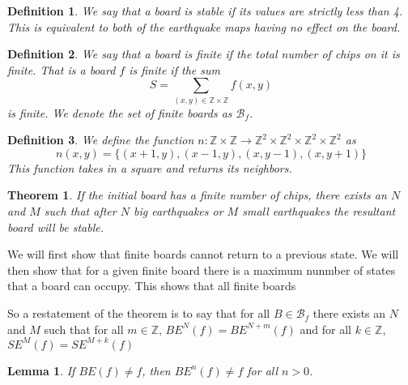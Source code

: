 \documentclass[11pt]{article}
\newtheorem{theorem}{Theorem}
\newtheorem{lemma}{Lemma}
\newtheorem{definition}{Definition}
\begin{document}
\begin{definition}
We say that a board is stable if its values are strictly less than 4. This is equivalent to both of the earthquake maps having no effect on the board. 
\end{definition}

\begin{definition} 
We say that a board is finite if the total number of chips on it is finite. That is a board $f$ is finite if the sum
\begin{equation}
S= \sum_{(x,y) \in \mathbb{Z} \times \mathbb{Z}} f(x,y) 
\end{equation}
is finite. 
We denote the set of finite boards as $\mathcal{B}_f$.
\end{definition}

\begin{definition}
We define the function $n: \mathbb{Z} \times \mathbb{Z} \rightarrow \mathbb{Z}^2 \times \mathbb{Z}^2 \times \mathbb{Z}^2 \times \mathbb{Z}^2 $ as 
\begin{equation}
n(x,y) = \{ (x+1, y), (x-1, y), (x, y-1), (x, y+1) \}
\end{equation}
This function takes in a square and returns its neighbors. 
\end{definition}

\begin{theorem}
\label{finitestability}
If the initial board has a finite number of chips, there exists an $N$ and $M$ such that after $N$ big earthquakes or $M$ small earthquakes the resultant board will be stable.
\end{theorem}

We will first show that finite boards cannot return to a previous state. We will then show that for a given finite board there is a maximum nunmber of states that a board can occupy. This shows that all finite boards 

So a restatement of the theorem is to say that for all $B \in \mathcal{B}_f$ there exists an $N$ and $M$ such that for all $m \in \mathbb{Z}$, $BE^N(f) = BE^{N+m}(f)$ and for all $k \in \mathbb{Z}$, $SE^{M}(f) = SE^{M+k}(f)$

\begin{lemma}
If $BE(f) \neq f$, then $BE^n(f) \neq f$ for all $n > 0$.
\end{lemma}
\end{document}

